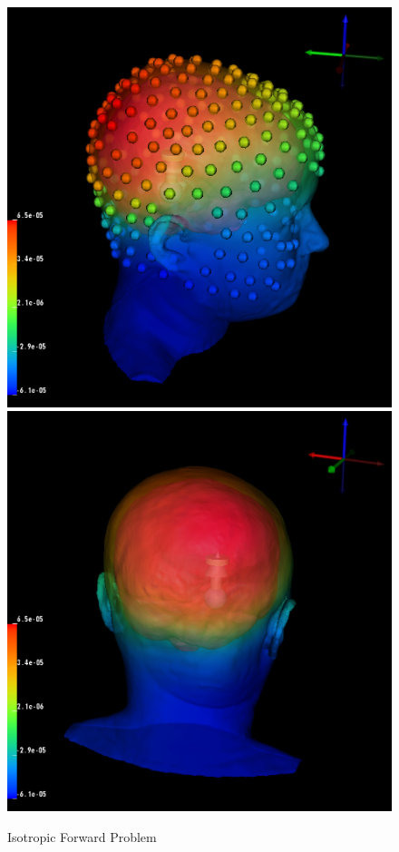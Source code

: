 \begin{figure}[H]
\begin{center}
\includegraphics[width=.49\textwidth]{Figures/iso_dipole}
\includegraphics[width=.49\textwidth]{Figures/iso_dipole_2}
\caption{Isotropic Forward Problem}
\label{fig:isodip}
\end{center}
\end{figure}

